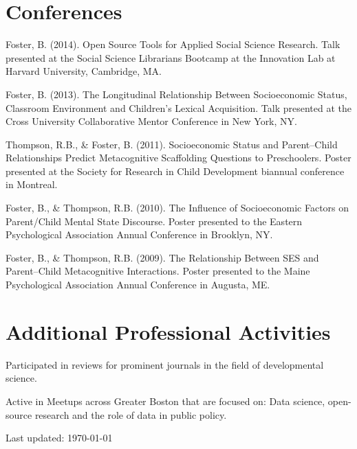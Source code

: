 \documentclass[letterpaper]{article}
\def\footerlink{http://ase.tufts.edu/epcshd/}
\renewenvironment{itemize}{
  \begin{list}{}{
    \setlength{\leftmargin}{1.5em}
  }
}{
  \end{list}
}
\begin{document}
\section*{Conferences}

\begin{itemize}

\item Foster, B. (2014). Open Source Tools for Applied Social Science Research. Talk presented at the Social Science Librarians Bootcamp at the Innovation Lab at Harvard University, Cambridge, MA. 

\item Foster, B. (2013). The Longitudinal Relationship Between Socioeconomic Status, Classroom Environment and Children’s Lexical Acquisition. Talk presented at the Cross University Collaborative Mentor Conference in New York, NY. 

\item Thompson, R.B., \& Foster, B. (2011). Socioeconomic Status and Parent--Child Relationships Predict Metacognitive Scaffolding Questions to Preschoolers. Poster presented at the Society for Research in Child Development biannual conference in Montreal. 

\item Foster, B., \& Thompson, R.B. (2010). The Influence of  Socioeconomic Factors on Parent/Child Mental State Discourse. Poster presented to the Eastern Psychological Association Annual Conference in Brooklyn, NY.

\item Foster, B., \& Thompson, R.B. (2009). The Relationship Between SES and Parent--Child Metacognitive Interactions. Poster presented to the Maine Psychological Association Annual Conference in Augusta, ME.

\end{itemize}

\section*{Additional Professional Activities}

\begin{itemize}

\item Participated in reviews for prominent journals in the field of developmental science. 
\item Active in Meetups across Greater Boston that are focused on: Data science, open-source research and the role of data in public policy.

\end{itemize}

\bigskip

\begin{center}
  \begin{footnotesize}
    Last updated: \today \\
  \end{footnotesize}
\end{center}
\end{document}
